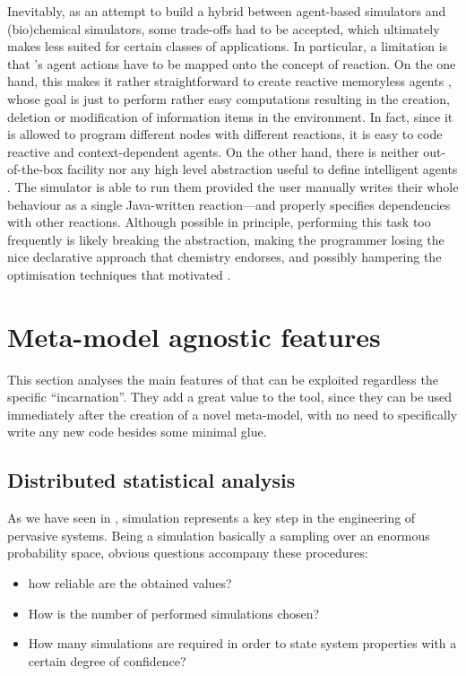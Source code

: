 \documentclass[12pt,a4paper,twoside,openright]{book}
\begin{document}
Inevitably, as an attempt to build a hybrid between agent-based simulators and (bio)chemical simulators, some trade-offs had to be accepted, which ultimately makes \alchemist{} less suited for certain classes of applications.
%
In particular, a limitation is that \alchemist{}'s agent actions have to be mapped onto the concept of reaction. 
%
On the one hand, this makes it rather straightforward to create reactive memoryless agents \cite{BandiniJASSS2009}, whose goal is just to perform rather easy computations resulting in the creation, deletion or modification of information items in the environment.
%
In fact, since it is allowed to program different nodes with different reactions, it is easy to code reactive and context-dependent agents. On the other hand, there is neither out-of-the-box facility nor any high level abstraction useful to define intelligent agents \cite{BandiniJASSS2009}. The simulator is able to run them provided the user manually writes their whole behaviour as a single Java-written reaction---and properly specifies dependencies with other reactions.
%
Although possible in principle, performing this task too frequently is likely breaking the \alchemist{} abstraction, making the programmer losing the nice declarative approach that chemistry endorses, and possibly hampering the optimisation techniques that motivated \alchemist{}.

\section{Meta-model agnostic features}

This section analyses the main features of \alchemist{} that can be exploited regardless the specific ``incarnation''.
%
They add a great value to the tool, since they can be used immediately after the creation of a novel meta-model, with no need to specifically write any new code besides some minimal glue.

\subsection{Distributed statistical analysis}

As we have seen in , simulation represents a key step in the engineering of pervasive systems.
%
Being a simulation basically a sampling over an enormous probability space, obvious questions accompany these procedures:
\begin{itemize}
 \item how reliable are the obtained values?
 \item How is the number of performed simulations chosen?
 \item How many simulations are required in order to state system properties with a certain degree of confidence?
\end{itemize}
\end{document}
